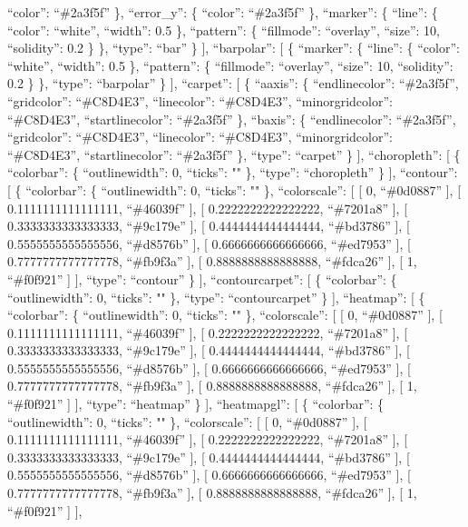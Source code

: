 \documentclass[
]{article}
\begin{document}
``color'': ``\#2a3f5f'' \}, ``error\_y'': \{ ``color'': ``\#2a3f5f'' \},
``marker'': \{ ``line'': \{ ``color'': ``white'', ``width'': 0.5 \},
``pattern'': \{ ``fillmode'': ``overlay'', ``size'': 10, ``solidity'':
0.2 \} \}, ``type'': ``bar'' \} {]}, ``barpolar'': {[} \{ ``marker'': \{
``line'': \{ ``color'': ``white'', ``width'': 0.5 \}, ``pattern'': \{
``fillmode'': ``overlay'', ``size'': 10, ``solidity'': 0.2 \} \},
``type'': ``barpolar'' \} {]}, ``carpet'': {[} \{ ``aaxis'': \{
``endlinecolor'': ``\#2a3f5f'', ``gridcolor'': ``\#C8D4E3'',
``linecolor'': ``\#C8D4E3'', ``minorgridcolor'': ``\#C8D4E3'',
``startlinecolor'': ``\#2a3f5f'' \}, ``baxis'': \{ ``endlinecolor'':
``\#2a3f5f'', ``gridcolor'': ``\#C8D4E3'', ``linecolor'': ``\#C8D4E3'',
``minorgridcolor'': ``\#C8D4E3'', ``startlinecolor'': ``\#2a3f5f'' \},
``type'': ``carpet'' \} {]}, ``choropleth'': {[} \{ ``colorbar'': \{
``outlinewidth'': 0, ``ticks'': "" \}, ``type'': ``choropleth'' \} {]},
``contour'': {[} \{ ``colorbar'': \{ ``outlinewidth'': 0, ``ticks'': ""
\}, ``colorscale'': {[} {[} 0, ``\#0d0887'' {]}, {[} 0.1111111111111111,
``\#46039f'' {]}, {[} 0.2222222222222222, ``\#7201a8'' {]}, {[}
0.3333333333333333, ``\#9c179e'' {]}, {[} 0.4444444444444444,
``\#bd3786'' {]}, {[} 0.5555555555555556, ``\#d8576b'' {]}, {[}
0.6666666666666666, ``\#ed7953'' {]}, {[} 0.7777777777777778,
``\#fb9f3a'' {]}, {[} 0.8888888888888888, ``\#fdca26'' {]}, {[} 1,
``\#f0f921'' {]} {]}, ``type'': ``contour'' \} {]}, ``contourcarpet'':
{[} \{ ``colorbar'': \{ ``outlinewidth'': 0, ``ticks'': "" \}, ``type'':
``contourcarpet'' \} {]}, ``heatmap'': {[} \{ ``colorbar'': \{
``outlinewidth'': 0, ``ticks'': "" \}, ``colorscale'': {[} {[} 0,
``\#0d0887'' {]}, {[} 0.1111111111111111, ``\#46039f'' {]}, {[}
0.2222222222222222, ``\#7201a8'' {]}, {[} 0.3333333333333333,
``\#9c179e'' {]}, {[} 0.4444444444444444, ``\#bd3786'' {]}, {[}
0.5555555555555556, ``\#d8576b'' {]}, {[} 0.6666666666666666,
``\#ed7953'' {]}, {[} 0.7777777777777778, ``\#fb9f3a'' {]}, {[}
0.8888888888888888, ``\#fdca26'' {]}, {[} 1, ``\#f0f921'' {]} {]},
``type'': ``heatmap'' \} {]}, ``heatmapgl'': {[} \{ ``colorbar'': \{
``outlinewidth'': 0, ``ticks'': "" \}, ``colorscale'': {[} {[} 0,
``\#0d0887'' {]}, {[} 0.1111111111111111, ``\#46039f'' {]}, {[}
0.2222222222222222, ``\#7201a8'' {]}, {[} 0.3333333333333333,
``\#9c179e'' {]}, {[} 0.4444444444444444, ``\#bd3786'' {]}, {[}
0.5555555555555556, ``\#d8576b'' {]}, {[} 0.6666666666666666,
``\#ed7953'' {]}, {[} 0.7777777777777778, ``\#fb9f3a'' {]}, {[}
0.8888888888888888, ``\#fdca26'' {]}, {[} 1, ``\#f0f921'' {]} {]},
\end{document}
